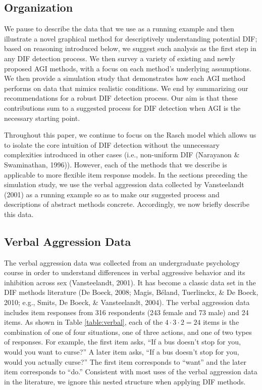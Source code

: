 \documentclass[
  english,
  man,floatsintext]{apa6}
\begin{document}
\hypertarget{organization}{%
\subsection{Organization}\label{organization}}

We pause to describe the data that we use as a running example and then illustrate a novel graphical method for descriptively understanding potential DIF; based on reasoning introduced below, we suggest such analysis as the first step in any DIF detection process. We then survey a variety of existing and newly proposed AGI methods, with a focus on each method's underlying assumptions. We then provide a simulation study that demonstrates how each AGI method performs on data that mimics realistic conditions. We end by summarizing our recommendations for a robust DIF detection process. Our aim is that these contributions sum to a suggested process for DIF detection when AGI is the necessary starting point.

Throughout this paper, we continue to focus on the Rasch model which allows us to isolate the core intuition of DIF detection without the unnecessary complexities introduced in other cases (i.e., non-uniform DIF (Narayanon \& Swaminathan, 1996)). However, each of the methods that we describe is applicable to more flexible item response models. In the sections preceding the simulation study, we use the verbal aggression data collected by Vansteelandt (2001) as a running example so as to make our suggested process and descriptions of abstract methods concrete. Accordingly, we now briefly describe this data.

\hypertarget{verbal-aggression-data}{%
\subsection{Verbal Aggression Data}\label{verbal-aggression-data}}

The verbal aggression data was collected from an undergraduate psychology course in order to understand differences in verbal aggressive behavior and its inhibition across sex (Vansteelandt, 2001). It has become a classic data set in the DIF methods literature (De Boeck, 2008; Magis, Béland, Tuerlinckx, \& De Boeck, 2010; e.g., Smits, De Boeck, \& Vansteelandt, 2004). The verbal aggression data includes item responses from 316 respondents (243 female and 73 male) and 24 items. As shown in Table \ref{table:verbal}, each of the \(4 \cdot 3 \cdot 2 = 24\) items is the combination of one of four situations, one of three actions, and one of two types of responses. For example, the first item asks, ``If a bus doesn't stop for you, would you want to curse?'' A later item asks, ``If a bus doesn't stop for you, would you actually curse?'' The first item corresponds to ``want'' and the later item corresponds to ``do.'' Consistent with most uses of the verbal aggression data in the literature, we ignore this nested structure when applying DIF methods.
\end{document}
